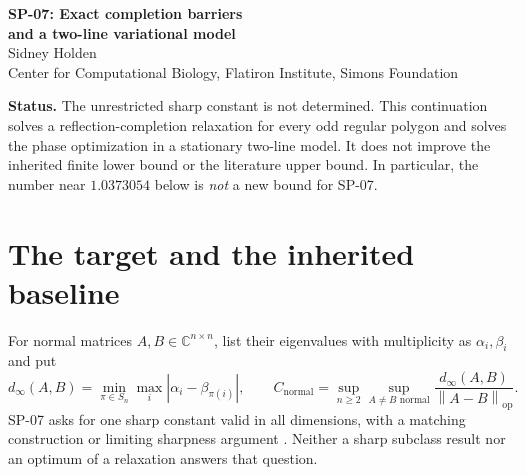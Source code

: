 \documentclass[11pt]{article}
\theoremstyle{remark}
\newcommand{\op}{\mathrm{op}}
\newcommand{\norm}[1]{\left\lVert#1\right\rVert_{\op}}
\newcommand{\Cstar}{C_{\mathrm{normal}}}
\begin{document}
\begin{center}
{\LARGE\bfseries SP-07: Exact completion barriers\\[4pt] and a two-line variational model}
\\[10pt] Sidney Holden\\[3pt]{\small Center for Computational Biology, Flatiron Institute, Simons Foundation}
\end{center}

\textbf{Status.} The unrestricted sharp constant is not determined. This continuation solves a reflection-completion relaxation for every odd regular polygon and solves the phase optimization in a stationary two-line model. It does not improve the inherited finite lower bound or the literature upper bound. In particular, the number near $1.0373054$ below is \emph{not} a new bound for SP-07.

\begin{abstract}
For a regular odd polygon of selected spectral values, we obtain an exact formula for the least anticommutator norm over all Hermitian-unitary completions of a prescribed circulant overlap. A norm-preserving orbit dilation removes the circulant assumption from the resulting obstruction: whenever the selected compression has an eigenvalue $+1$ or $-1$, the selected pair-sum separation cannot exceed the full anticommutator norm. Thus this geometry cannot produce a greater-than-one selected Hall quotient, in arbitrary completion dimension.

An explicit sequence of compressed optima has quotient tending to $\pi/2$, while its best completed selected quotient tends to zero. Separately, a bounded anticommutator of an unbounded normal two-line operator reduces to a scalar speed-control problem with an exact integral solution. Rational arithmetic certifies its formal selected quotient at one parameter pair between $1.0373054176426$ and $1.0373054176428$. An explicit infinite matching, however, has a ratio below one. This identifies the finite Hall deficit and its boundary realization as essential missing ingredients, rather than silently transferring an infinite or compressed optimum to SP-07.
\end{abstract}

\section{The target and the inherited baseline}
For normal matrices $A,B\in\mathbb C^{n\times n}$, list their eigenvalues with multiplicity as $\alpha_i,\beta_i$ and put
\[
 d_\infty(A,B)=\min_{\pi\in S_n}\max_i|\alpha_i-\beta_{\pi(i)}|,
 \qquad
 \Cstar=\sup_{n\ge2}\sup_{A\ne B\text{ normal}}
 \frac{d_\infty(A,B)}{\norm{A-B}}.
\]
SP-07 asks for one sharp constant valid in all dimensions, with a matching construction or limiting sharpness argument \cite{sp07}. Neither a sharp subclass result nor an optimum of a relaxation answers that question.
\end{document}
